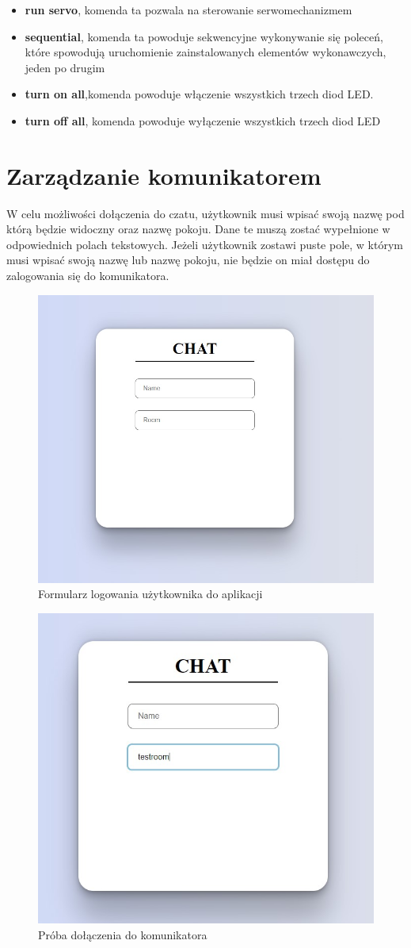 \begin{itemize}
	\\
	\item \textbf{run servo}, komenda ta pozwala na sterowanie serwomechanizmem
	\\
\item \textbf{sequential}, komenda ta powoduje sekwencyjne wykonywanie się poleceń, które spowodują uruchomienie zainstalowanych elementów wykonawczych, jeden po drugim
	\\
	\item \textbf{turn on all},komenda powoduje włączenie wszystkich trzech diod LED.
	\\
\item \textbf{turn off all}, komenda powoduje wyłączenie wszystkich trzech diod LED
	\\
\end{itemize}
\newpage
\section{Zarządzanie komunikatorem}
W celu możliwości dołączenia do czatu, użytkownik musi wpisać swoją nazwę pod którą będzie widoczny oraz nazwę pokoju. Dane te muszą zostać wypełnione w odpowiednich polach tekstowych. Jeżeli użytkownik zostawi puste pole, w którym musi wpisać swoją nazwę lub nazwę pokoju, nie będzie on miał dostępu do zalogowania się do komunikatora.
\begin{figure}[htbp]
	\centering
	\includegraphics[width=0.5\linewidth]{"obrazy/TESTLOGOWANIE"}
	\caption{Formularz logowania użytkownika do aplikacji}
	\label{fig:39}
\end{figure}
\begin{figure}[htbp]
	\centering
	\includegraphics[width=0.5\linewidth]{"obrazy/TESTnazwapokoju"}
	\caption{Próba dołączenia do komunikatora}
	\label{fig:40}
\end{figure}
